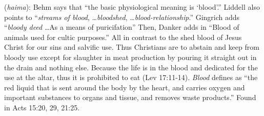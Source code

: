 \item[Blood,]
 
(\textit{haima}):
Behm says that ``the basic physiological meaning is `blood'.'' 
Liddell also points to ``\emph{streams of blood}, \ldots \emph{bloodshed}, \ldots \emph{blood-relationship}.'' 
Gingrich adds ``\emph{bloody deed} \ldots As a means of puricifation'' Then, Danker adds in ``Blood of animals used for cultic purposes.'' 
All in contrast to the shed blood of Jesus Christ for our sins and salvific use. Thus Christians are to abstain and keep from bloody use except for slaughter in meat production by pouring it straight out in the drain and nothing else. Because the life is in the blood and dedicated for the use at the altar, thus it is prohibited to eat (Lev 17:11-14). \emph{Blood} defines as “the red liquid that is sent around the body by the heart, and carries oxygen and important substances to organs and tissue, and removes waste products.”
Found in Acts 15:20, 29, 21:25.
